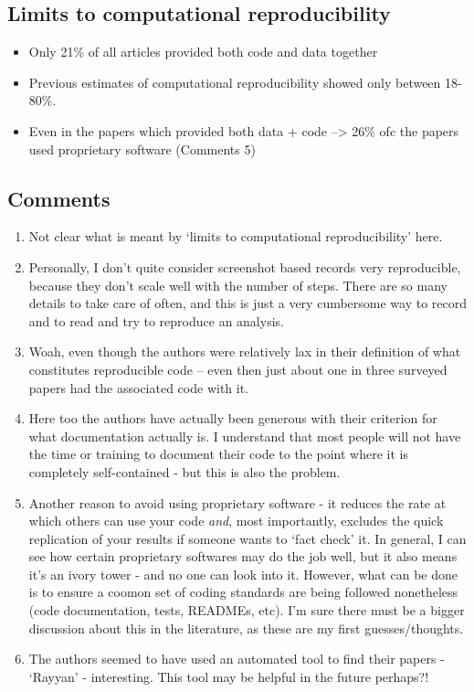 \documentclass[
]{book}
\providecommand{\tightlist}{%
  \setlength{\itemsep}{0pt}\setlength{\parskip}{0pt}}
\begin{document}
\hypertarget{limits-to-computational-reproducibility}{%
\subsection{Limits to computational reproducibility}\label{limits-to-computational-reproducibility}}

\begin{itemize}
\tightlist
\item
  Only 21\% of all articles provided both code and data together
\item
  Previous estimates of computational reproducibility showed only between 18-80\%.
\item
  Even in the papers which provided both data + code --\textgreater{} 26\% ofc the papers used proprietary software (\protect\hypertarget{comments_culina}{}{Comments} 5)
\end{itemize}

\hypertarget{comments_culina}{%
\subsection{Comments}\label{comments_culina}}

\begin{enumerate}
\def\labelenumi{\arabic{enumi}.}
\tightlist
\item
  Not clear what is meant by `limits to computational reproducibility' here.
\item
  Personally, I don't quite consider screenshot based records very reproducible, because they don't scale well with the number of steps. There are so many details to take care of often, and this is just a very cumbersome way to record and to read and try to reproduce an analysis.
\item
  Woah, even though the authors were relatively lax in their definition of what constitutes reproducible code -- even then just about one in three surveyed papers had the associated code with it.
\item
  Here too the authors have actually been generous with their criterion for what documentation actually is. I understand that most people will not have the time or training to document their code to the point where it is completely self-contained - but this is also the problem.
\item
  Another reason to avoid using proprietary software - it reduces the rate at which others can use your code \emph{and}, most importantly, excludes the quick replication of your results if someone wants to `fact check' it. In general, I can see how certain proprietary softwares may do the job well, but it also means it's an ivory tower - and no one can look into it. However, what can be done is to ensure a coomon set of coding standards are being followed nonetheless (code documentation, tests, READMEs, etc). I'm sure there must be a bigger discussion about this in the literature, as these are my first guesses/thoughts.
\item
  The authors seemed to have used an automated tool to find their papers - `Rayyan' - interesting. This tool may be helpful in the future perhaps?!
\end{enumerate}
\end{document}
